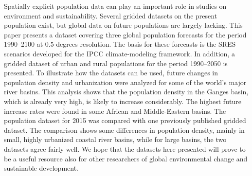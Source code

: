 Spatially explicit population data can play an important role in studies on environment and sustainability. Several gridded datasets on the present population exist, but global data on future populations are largely lacking. This paper presents a dataset covering three global population forecasts for the period 1990--2100 at 0.5-degrees resolution. The basis for these forecasts is the SRES scenarios developed for the IPCC climate-modeling framework. In addition, a gridded dataset of urban and rural populations for the period 1990--2050 is presented. To illustrate how the datasets can be used, future changes in population density and urbanization were analyzed for some of the world's major river basins. This analysis shows that the population density in the Ganges basin, which is already very high, is likely to increase considerably. The highest future increase rates were found in some African and Middle-Eastern basins. The population dataset for 2015 was compared with one previously published gridded dataset. The comparison shows some differences in population density, mainly in small, highly urbanized coastal river basins, while for large basins, the two datasets agree fairly well. We hope that the datasets here presented will prove to be a useful resource also for other researchers of global environmental change and sustainable development.
